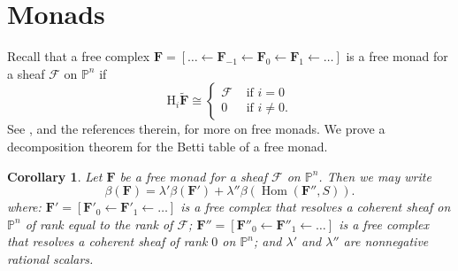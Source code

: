\documentclass[12pt]{amsart}
\newtheorem{cor}[lemma]{Corollary}
\theoremstyle{definition}
\theoremstyle{remark}
\newcommand{\Hom}{\operatorname{Hom}} %
\newcommand{\PP}{\mathbb{P}}
\newcommand{\HH}{\mathrm{H}}
\newcommand{\cF}{\mathcal{F}}
\newcommand{\FF}{\mathbf{F}}
\newcommand{\defi}[1]{\textsf{#1}} %
\begin{document}
\section{Monads}\label{sec:monads}

Recall that a free complex $\FF=[\dots \gets \FF_{-1}\gets \FF_0\gets \FF_1\gets \dots]$ is a \defi{free monad} for a sheaf $\cF$ on $\PP^{n}$ if 
$$
\HH_i\widetilde{\FF}\cong
\begin{cases}                    \cF&\text{ if } i=0\\
					0 &\text{ if } i\neq 0.
\end{cases}
$$					
See \cite[\S8]{eis-floy-schrey}, and the references therein, for more on free monads.  We prove a decomposition theorem for the Betti table of a free monad.
\begin{cor}\label{cor:monads}
Let $\FF$ be a free monad for a sheaf $\cF$ on $\PP^n$.  Then we may write
\[
\beta(\FF)=\lambda'\beta(\FF')+\lambda''\beta(\Hom(\FF'',S)).
\]
where: $\FF'=[\FF'_0\gets \FF'_1\gets \dots]$ is a free complex that resolves a coherent sheaf on $\PP^n$ of rank equal to the rank of $\cF$; $\FF''=[\FF''_0\gets \FF''_1\gets \dots]$ is a free complex that resolves a coherent sheaf of rank $0$ on $\PP^n$; and $\lambda'$ and $\lambda''$ are nonnegative rational scalars.
\end{cor}
\end{document}
